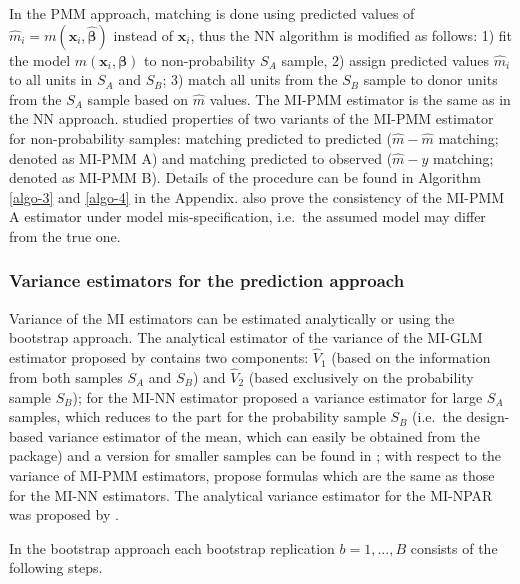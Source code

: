 \documentclass[
]{jss}
\begin{document}
In the PMM approach, matching is done using predicted values of
\(\hat{m}_i=m\left(\boldsymbol{x}_i, \hat{\boldsymbol{\beta}}\right)\)
instead of \(\boldsymbol{x}_i\), thus the NN algorithm is modified as
follows: 1) fit the model
\(m\left(\boldsymbol{x}_i, \boldsymbol{\beta}\right)\) to
non-probability \(S_A\) sample, 2) assign predicted values \(\hat{m}_i\)
to all units in \(S_A\) and \(S_B\); 3) match all units from the \(S_B\)
sample to donor units from the \(S_A\) sample based on \(\hat{m}\)
values. The MI-PMM estimator is the same as in the NN approach.
\citet{chlebicki2025} studied properties of two variants of the MI-PMM
estimator for non-probability samples: matching predicted to predicted
(\(\hat{m}-\hat{m}\) matching; denoted as MI-PMM A) and matching
predicted to observed (\(\hat{m}-y\) matching; denoted as MI-PMM B).
Details of the procedure can be found in Algorithm \ref{algo-3} and
\ref{algo-4} in the Appendix. \citet{chlebicki2025} also prove the
consistency of the MI-PMM A estimator under model mis-specification,
i.e.~the assumed model may differ from the true one.

\subsubsection{Variance estimators for the prediction
approach}\label{variance-estimators-for-the-prediction-approach}

Variance of the MI estimators can be estimated analytically or using the
bootstrap approach. The analytical estimator of the variance of the
MI-GLM estimator proposed by \citet[p. 950]{kim_combining_2021} contains
two components: \(\hat{V}_1\) (based on the information from both
samples \(S_A\) and \(S_B\)) and \(\hat{V}_2\) (based exclusively on the
probability sample \(S_B\)); for the MI-NN estimator
\citet{yang2021integration} proposed a variance estimator for large
\(S_A\) samples, which reduces to the part for the probability sample
\(S_B\) (i.e.~the design-based variance estimator of the mean, which can
easily be obtained from the  package) and a version for
smaller samples can be found in \citet{chlebicki2025}; with respect to
the variance of MI-PMM estimators, \citet{chlebicki2025} propose
formulas which are the same as those for the MI-NN estimators. The
analytical variance estimator for the MI-NPAR was proposed by
\citet{chen_nonparametric_2022}.

In the bootstrap approach each bootstrap replication \(b=1,...,B\)
consists of the following steps.
\end{document}
